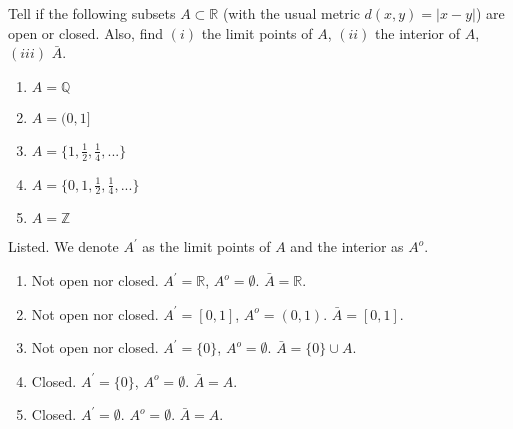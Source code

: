   \begin{exercise}
    Tell if the following subsets $A \subset \mathbb{R}$ (with the usual metric $d(x,y) = |x-y|$)
    are open or closed. Also, find $(i)$ the limit points of $A$, $(ii)$ the interior of
    $A$, $(iii)$ $\bar{A}$.
    \begin{enumerate}
      \item $A = \mathbb{Q}$
      \item $A = (0,1]$
      \item $A = \{1, \frac{1}{2}, \frac{1}{4}, ...\}$
      \item $A = \{0, 1, \frac{1}{2}, \frac{1}{4}, ...\}$
      \item $A = \mathbb{Z}$
    \end{enumerate}
  \end{exercise} 
  \begin{solution}
    Listed. We denote $A^\prime$ as the limit points of $A$ and the interior as $A^o$. 
    \begin{enumerate}
      \item Not open nor closed. $A^\prime = \mathbb{R}$, $A^o = \emptyset$. $\bar{A} = \mathbb{R}$. 
      \item Not open nor closed. $A^\prime = [0, 1]$, $A^o = (0, 1)$. $\bar{A} = [0, 1]$. 
      \item Not open nor closed. $A^\prime = \{0\}$, $A^o = \emptyset$. $\bar{A} = \{ 0 \} \cup A$. 
      \item Closed. $A^\prime = \{0\}$, $A^o = \emptyset$. $\bar{A} = A$. 
      \item Closed. $A^\prime = \emptyset$. $A^o = \emptyset$. $\bar{A} = A$. 
    \end{enumerate}
  \end{solution}
  
